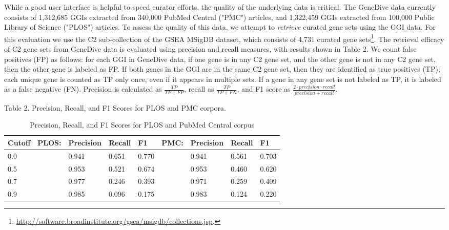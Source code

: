 \documentclass{ws-procs11x85}
\begin{document}
While a good user interface is helpful to speed curator efforts, the quality of the underlying data is critical. The GeneDive data currently consists of 1,312,685 GGIs extracted from 340,000 PubMed Central ("PMC") articles, and 1,322,459 GGIs extracted from 100,000 Public Library of Science ("PLOS") articles. To assess the quality of this data, we attempt to \emph{retrieve} curated gene sets using the GGI data.  For this evaluation we use the C2 sub-collection of the GSEA MSigDB dataset, which consists of 4,731 curated gene sets\footnote{\url{http://software.broadinstitute.org/gsea/msigdb/collections.jsp}.}. The retrieval efficacy of C2 gene sets from GeneDive data is evaluated using precision and recall measures, with results shown in Table 2. We count false positives (FP) as follows: for each GGI in GeneDive data, if one gene is in any C2 gene set, and the other gene is not in any C2 gene set, then the other gene is labeled as FP. If both genes in the GGI are in the same C2 gene set, then they are identified as true positives (TP); each unique gene is counted as TP only once, even if it appears in multiple sets.  If a gene in any gene set is not labeled as TP, it is labeled as a false negative (FN). Precision is calculated as $\frac{TP}{TP+FP}$, recall as $\frac{TP}{TP+FN}$, and F1 score as $\frac{2 \cdot precision \cdot recall }{ precision + recall}$.
\begin{table}[ht]
\caption{Precision, Recall, and F1 Scores for PLOS and PubMed Central corpus}
\centering
Table 2. Precision, Recall, and F1 Scores for PLOS and PMC corpora.
\label{tab:precision-recall}
\begin{tabular}{l|llll|llll}
\hline
Cutoff & PLOS: & Precision & Recall & F1 & PMC: & Precision & Recall & F1 \\ \hline
0.0 &  & 0.941 & 0.651 & 0.770 &  & 0.941 & 0.561 & 0.703 \\
0.5 &  & 0.953 & 0.521 & 0.674 &  & 0.953 & 0.460 & 0.620 \\
0.7 &  & 0.977 & 0.246 & 0.393 &  & 0.971 & 0.259 & 0.409 \\
0.9 &  & 0.985 & 0.096 & 0.175 &  & 0.983 & 0.124 & 0.220 \\ \hline
\end{tabular}
\end{table}
\end{document}
